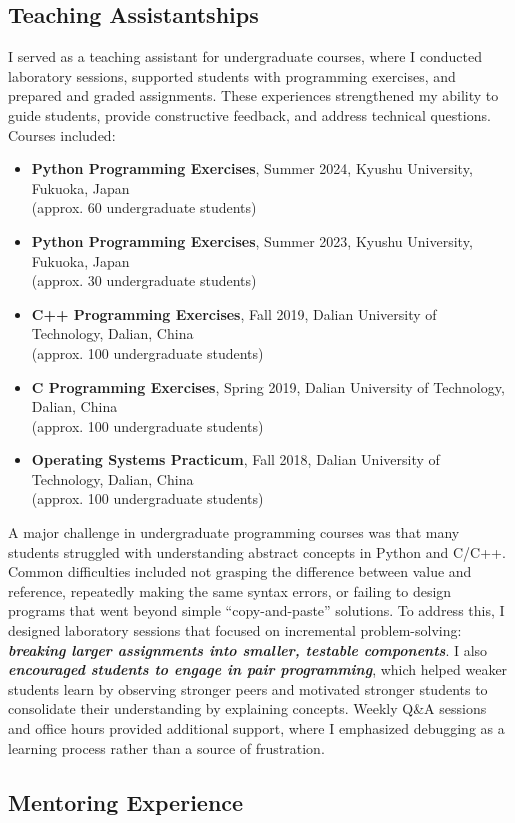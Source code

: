 \documentclass[11pt,a4paper]{moderncv}        %
\newcommand{\strongit}[1]{\textbf{\textit{#1}}}
\newcommand{\supervisionentry}[5]{%
  \item \textbf{#1}, #2, #3, #4 \\ %
  {#5} %
}
\begin{document}
\subsection{Teaching Assistantships}

I served as a teaching assistant for undergraduate courses, where I conducted laboratory sessions, supported students with programming exercises, and prepared and graded assignments. These experiences strengthened my ability to guide students, provide constructive feedback, and address technical questions. Courses included:

\begin{itemize}
    \supervisionentry{Python Programming Exercises}{Summer 2024}{Kyushu University}{Fukuoka, Japan}{(approx. 60 undergraduate students)}
    \supervisionentry{Python Programming Exercises}{Summer 2023}{Kyushu University}{Fukuoka, Japan}{(approx. 30 undergraduate students)}
    \supervisionentry{C++ Programming Exercises}{Fall 2019}{Dalian University of Technology}{Dalian, China}{(approx. 100 undergraduate students)}
    \supervisionentry{C Programming Exercises}{Spring 2019}{Dalian University of Technology}{Dalian, China}{(approx. 100 undergraduate students)}
    \supervisionentry{Operating Systems Practicum}{Fall 2018}{Dalian University of Technology}{Dalian, China}{(approx. 100 undergraduate students)}
\end{itemize}

A major challenge in undergraduate programming courses was that many students struggled with understanding abstract concepts in Python and C/C++. Common difficulties included not grasping the difference between value and reference, repeatedly making the same syntax errors, or failing to design programs that went beyond simple “copy-and-paste” solutions. To address this, I designed laboratory sessions that focused on incremental problem-solving: \strongit{breaking larger assignments into smaller, testable components}. I also \strongit{encouraged students to engage in pair programming}, which helped weaker students learn by observing stronger peers and motivated stronger students to consolidate their understanding by explaining concepts. Weekly Q\&A sessions and office hours provided additional support, where I emphasized debugging as a learning process rather than a source of frustration.

\subsection{Mentoring Experience}
\end{document}
